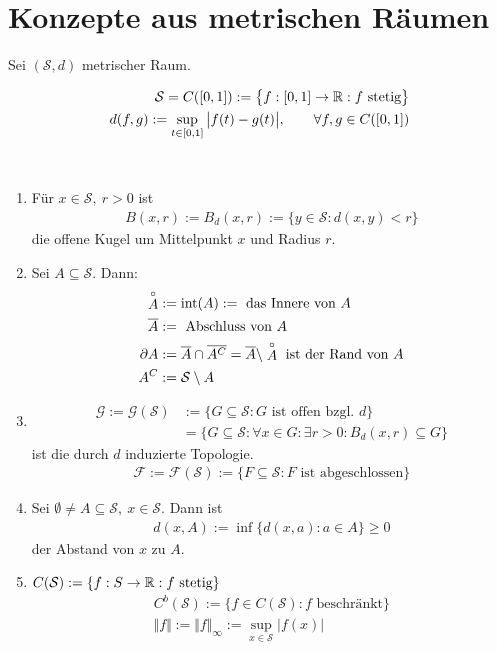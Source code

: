\section{Konzepte aus metrischen Räumen}
Sei $(\mathcal{S},d)$ metrischer Raum.

\begin{beispiel} %
	\begin{align*}
		\mathcal{S}=C([0,1]):=\big\lbrace f:[0,1]\to\mathbb{R}: f\text{ stetig}\big\rbrace\\
		d(f,g):=\sup\limits_{t\in[0,1]}\big|f(t)-g(t)\big|,\qquad\forall f,g\in C([0,1])
	\end{align*}
\end{beispiel}

\begin{definition}\
	\begin{enumerate}[label={(\arabic*)}]
		\item Für $x\in\mathcal{S},~r>0$ ist
		\begin{align*}
			B(x,r):=B_d(x,r):=\lbrace y\in\mathcal{S}:d(x,y)<r\rbrace
		\end{align*}
		die offene Kugel um Mittelpunkt $x$ und Radius $r$.
		\item Sei $A\subseteq\mathcal{S}$. Dann:
		\begin{align*}
			\stackrel{\circ}{A}&:=\operatorname{int}(A):=\text{ das Innere von }A\\
			\overline{A}&:=\text{ Abschluss von }A\\
			\partial A&:=\overline{A}\cap\overline{A^C}=\overline{A}\setminus\stackrel{\circ}{A}\text{ ist der Rand von }A\\
			A^C&:=\mathcal{S}\setminus A
		\end{align*}
		\item \begin{align*}
			\mathcal{G}:=\mathcal{G}(\mathcal{S})&:=\big\lbrace G\subseteq\mathcal{S}: G\text{ ist offen bzgl. }d\big\rbrace\\
			&=\big\lbrace G\subseteq\mathcal{S}:\forall x\in G:\exists r>0:B_d(x,r)\subseteq G\big\rbrace
		\end{align*}
		ist die durch $d$ induzierte Topologie.
		\begin{align*}
			\mathcal{F}:=\mathcal{F}(\mathcal{S}):=\big\lbrace F\subseteq\mathcal{S}:F\text{ ist abgeschlossen}\big\rbrace
		\end{align*}
		\item Sei $\emptyset\neq A\subseteq\mathcal{S},~x\in\mathcal{S}$. Dann ist
		\begin{align*}
			d(x,A):=\inf\lbrace d(x,a):a\in A\rbrace\geq0
		\end{align*}
		der Abstand von $x$ zu $A$.
		\item $C(\mathcal{S}):=\lbrace f:S\to\mathbb{R}:f\text{ stetig}\rbrace$
		\begin{align*}
			C^b(\mathcal{S}):=\lbrace f\in C(\mathcal{S}):f\text{ beschränkt}\rbrace\\
			\Vert f\Vert:=\Vert f\Vert_\infty:=\sup\limits_{x\in\mathcal{S}}|f(x)|
		\end{align*}
	\end{enumerate}
\end{definition}


